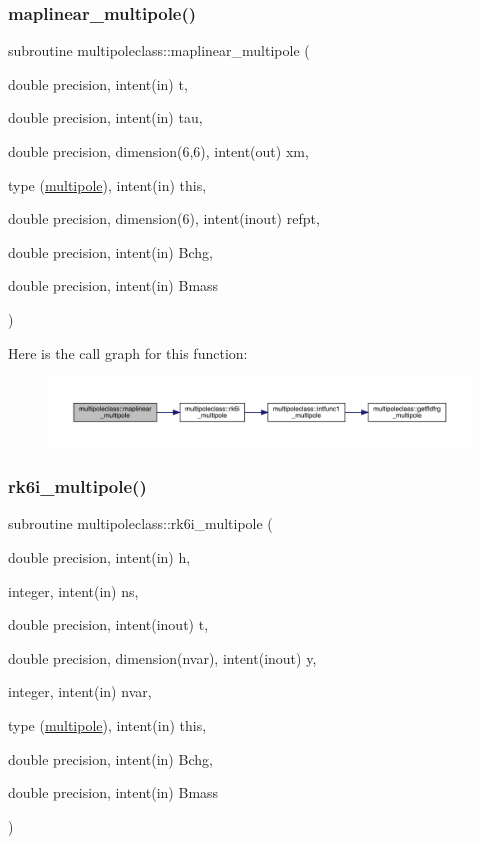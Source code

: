 \subsubsection{\texorpdfstring{maplinear\_multipole()}{maplinear\_multipole()}}
{\footnotesize\ttfamily subroutine multipoleclass\+::maplinear\+\_\+multipole (\begin{DoxyParamCaption}\item[{double precision, intent(in)}]{t,  }\item[{double precision, intent(in)}]{tau,  }\item[{double precision, dimension(6,6), intent(out)}]{xm,  }\item[{type (\mbox{\hyperlink{namespacemultipoleclass_structmultipoleclass_1_1multipole}{multipole}}), intent(in)}]{this,  }\item[{double precision, dimension(6), intent(inout)}]{refpt,  }\item[{double precision, intent(in)}]{Bchg,  }\item[{double precision, intent(in)}]{Bmass }\end{DoxyParamCaption})}

Here is the call graph for this function\+:\nopagebreak
\begin{figure}[H]
\begin{center}
\leavevmode
\includegraphics[width=350pt]{namespacemultipoleclass_ab9ed6db5fa3b4ea0f6e1a07cd6d57431_cgraph}
\end{center}
\end{figure}
\mbox{\label{namespacemultipoleclass_aebbed53759ae97dc55df35264c89274c}} 
\subsubsection{\texorpdfstring{rk6i\_multipole()}{rk6i\_multipole()}}
{\footnotesize\ttfamily subroutine multipoleclass\+::rk6i\+\_\+multipole (\begin{DoxyParamCaption}\item[{double precision, intent(in)}]{h,  }\item[{integer, intent(in)}]{ns,  }\item[{double precision, intent(inout)}]{t,  }\item[{double precision, dimension(nvar), intent(inout)}]{y,  }\item[{integer, intent(in)}]{nvar,  }\item[{type (\mbox{\hyperlink{namespacemultipoleclass_structmultipoleclass_1_1multipole}{multipole}}), intent(in)}]{this,  }\item[{double precision, intent(in)}]{Bchg,  }\item[{double precision, intent(in)}]{Bmass }\end{DoxyParamCaption})}

